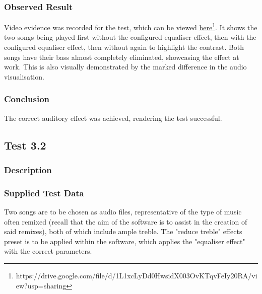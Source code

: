 \subsubsection*{Observed Result}
\label{sec:evidence3.1}
Video evidence was recorded for the test, which can be viewed \href{https://drive.google.com/file/d/1L1xcLyDd0HwsidX003OvKTqvFeIy20RA/view?usp=sharing}{here}\footnote{
	https://drive.google.com/file/d/1L1xcLyDd0HwsidX003OvKTqvFeIy20RA/view?usp=sharing
}. It shows the two songs being played first without the configured equaliser effect, then with the configured equaliser effect, then without again to highlight the contrast. Both songs have their bass almost completely eliminated, showcasing the effect at work. This is also visually demonstrated by the marked difference in the audio visualisation.

\subsubsection*{Conclusion}
The correct auditory effect was achieved, rendering the test successful.


\pagebreak
\subsection{Test 3.2}
\subsubsection*{Description}
\paragraph{}
{
	\centering
}

\subsubsection*{Supplied Test Data}
Two songs are to be chosen as audio files, representative of the type of music often remixed (recall that the aim of the software is to assist in the creation of said remixes), both of which include ample treble. The "reduce treble" effects preset is to be applied within the software, which applies the "equaliser effect" with the correct parameters.

